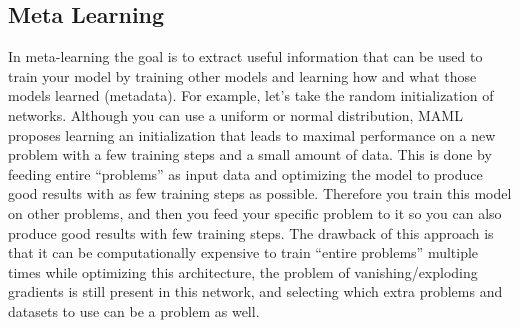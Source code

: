 \subsection{Meta Learning}
In meta-learning the goal is to extract useful information that can be used to train your model by training other models and learning how and what those models learned (metadata). For example, let's take the random initialization of networks. Although you can use a uniform or normal distribution, MAML \cite{MAML} proposes learning an initialization that leads to maximal performance on a new problem with a few training steps and a small amount of data. This is done by feeding entire ``problems'' as input data and optimizing the model to produce good results with as few training steps as possible. Therefore you train this model on other problems, and then you feed your specific problem to it so you can also produce good results with few training steps. The drawback of this approach is that it can be computationally expensive to train ``entire problems'' multiple times while optimizing this architecture, the problem of vanishing/exploding gradients is still present in this network, and selecting which extra problems and datasets to use can be a problem as well.

